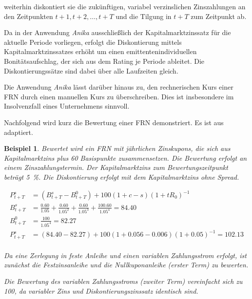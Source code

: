 \documentclass[12pt, a4paper]{article}
\theoremstyle{plain}
\newtheorem{example}{Beispiel}
\begin{document}
weiterhin diskontiert sie die zukünftigen, variabel verzinslichen Zinszahlungen an den Zeitpunkten $t+1, t+2, \ldots, t+T$ und die Tilgung in $t+T$  zum Zeitpunkt ab. 

Da in der Anwendung \textit{Anika} ausschließlich der Kapitalmarktzinssatz für die aktuelle Periode vorliegen, erfolgt die Diskontierung mittels Kapitalmarktzinssatzes erhöht um einen emittentenindividuellen Bonitätsaufschlag, der sich aus dem Rating je Periode ableitet. Die Diskontierungssätze sind dabei über alle Laufzeiten gleich.

Die Anwendung \textit{Anika} lässt darüber hinaus zu, den rechnerischen Kurs einer \gls{FRN} durch einen manuellen Kurs zu überschreiben. Dies ist insbesondere im Insolvenzfall eines Unternehmens sinnvoll.

Nachfolgend wird kurz die Bewertung einer \gls{FRN} demonstriert. Es ist aus \textcite[][32]{alexander_market_2008} adaptiert.

\begin{example}
	Bewertet wird ein \gls{FRN} mit jährlichen Zinskupons, die sich aus Kapitalmarktzins plus 60 Basispunkte zusammensetzen. Die Bewertung erfolgt an einem Zinszahlungstermin. Der Kapitalmarktzins zum Bewertungszeitpunkt beträgt 5~\%.
	Die Diskontierung erfolgt mit dem Kapitalmarktzins ohne Spread.

	\begin{align*}
		P_{t+T}^{s}&=\left(B_{t+T}^{s}-B_{t+T}^{0}\right)+100(1+c - s)\left(1+t R_{0}\right)^{-1}\\
		B_{t+T}^{s}&=\frac{0.60}{1.05}+\frac{0.60}{1.05^2}+\frac{0.60}{1.05^3}+\frac{100.60}{1.05^4}=84.40\\
		B_{t+T}^{0}&=\frac{100}{1.05^4}=82.27\\
		P_{t+T}^{s}&= (84.40-82.27) + 100(1+0.056 - 0.006) (1+0.05)^{-1} = 102.13\\
	\end{align*}

	Da eine Zerlegung in feste Anleihe und einen variablen Zahlungsstrom erfolgt, ist zunächst die Festzinsanleihe und die Nullkuponanleihe (erster Term) zu bewerten.

	Die Bewertung des variablen Zahlungsstroms (zweiter Term) vereinfacht sich zu 100, da variabler Zins und Diskontierungszinssatz identisch sind.
\end{example}

\end{document}
